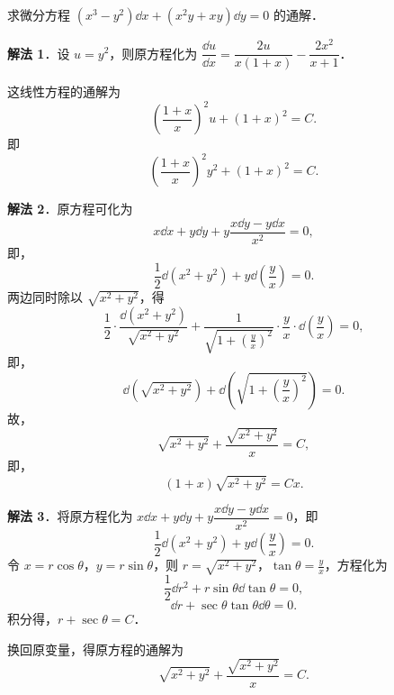 求微分方程 $(x^3-y^2)\dd x+(x^2y+xy)\dd y=0$ 的通解．
\begin{solution}
\textbf{解法 1}．设 $u=y^2$，则原方程化为 $\dfrac{\dd u}{\dd x}=\dfrac{2u}{x(1+x)}-\dfrac{2x^2}{x+1}$．

这线性方程的通解为
\[
  \left(\frac{1+x}{x}\right)^2u+(1+x)^2=C.
\]
即
\[
  \left(\frac{1+x}{x}\right)^2y^2+(1+x)^2=C.
\]

\textbf{解法 2}．原方程可化为
\[
  x\dd x+y\dd y+y\frac{x\dd y-y\dd x}{x^2}=0,
\]
即，
\[
  \frac{1}{2}\dd(x^2+y^2)+y\dd\left(\frac{y}{x}\right)=0.
\]
两边同时除以 $\sqrt{x^2+y^2}$，得
\[
  \frac{1}{2}\cdot\frac{\dd(x^2+y^2)}{\sqrt{x^2+y^2}}
  +\frac{1}{\sqrt{1+\left(\frac{y}{x}\right)^2}}\cdot\frac{y}{x}\cdot\dd\left(\frac{y}{x}\right)=0,
\]
即，
\[
  \dd\left(\sqrt{x^2+y^2}\right)+\dd\left(\sqrt{1+\left(\frac{y}{x}\right)^2}\right)=0.
\]
故，
\[
  \sqrt{x^2+y^2}+\frac{\sqrt{x^2+y^2}}{x}=C,
\]
即，
\[
  (1+x)\sqrt{x^2+y^2}=Cx.
\]

\textbf{解法 3}．将原方程化为 $x\dd x+y\dd y+y\dfrac{x\dd y-y\dd x}{x^2}=0$，即
\[
  \frac{1}{2}\dd(x^2+y^2)+y\dd\left(\frac{y}{x}\right)=0.
\]
令 $x=r\cos\theta$，$y=r\sin\theta$，则 $r=\sqrt{x^2+y^2}$，$\tan\theta=\frac{y}{x}$，方程化为
\[
  \frac{1}{2}\dd r^2+r\sin\theta\dd\tan\theta=0,
\]
\[
  \dd r+\sec\theta\tan\theta\dd\theta=0.
\]
积分得，$r+\sec\theta=C$．

换回原变量，得原方程的通解为
\[
  \sqrt{x^2+y^2}+\frac{\sqrt{x^2+y^2}}{x}=C.
\]
\end{solution}

